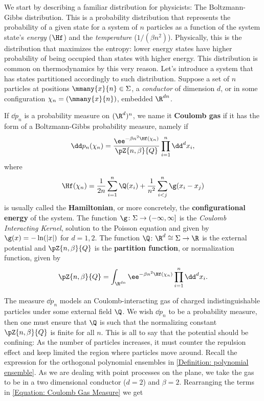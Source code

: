 We start by describing a familiar distribution for physicists: The Boltzmann-Gibbs distribution. This is a probability distribution that represents the probability of a given state for a system of $n$ particles as a function of the system state's \textit{energy} ($\Hf$) and the \textit{temperature} ($1/(\beta n^2)$). Physically, this is the distribution that maximizes the entropy: lower energy states have higher probability of being occupied than states with higher energy.  This distribution is common on thermodynamics by this very reason. Let's introduce a system that has states partitioned accordingly to such distribution. Suppose a set of $n$ particles at positions $\mmany{x}{n} \in \Sigma$, a \textit{conductor} of dimension $d$, or in some configuration $\chi_n = (\mmany{x}{n})$, embedded $\R^{dn}$.
\begin{definicao}
	If $\dd p_n$ is a probability measure on $(\R^d)^n$, we name it \textbf{Coulomb gas} if it has the form of a Boltzmann-Gibbs probability measure, namely if
	\begin{equation}
		\dd p_n(\chi_n) = \frac{\ee^{-\beta n^2 \Hf(\chi_n)}}{\pZ{n, \beta}{Q}} \prod_{i=1}^{n} \dd^d x_i,
		\label{Equation: Coulomb Gas Measure}
	\end{equation}
	where 
	\begin{equation}
		\Hf(\chi_n) = \frac{1}{2n} \sum_{i = 1}^{n} \Q(x_i) + \frac{1}{n^2} \sum_{i < j}^{n} \g(x_i - x_j)	
	\end{equation}
	is usually called the \textbf{Hamiltonian}, or more concretely, the \textbf{configurational energy} of the system. The function $\g \colon \Sigma \rightarrow (-\infty, \infty]$ is the \textit{Coulomb Interacting Kernel}, solution to the Poisson equation and given by 
	$
	\g(x) = - \ln(|x|)
	$ for $d = 1, 2$.
	The function $\Q \colon \R^d \cong \Sigma \rightarrow \R$ is the external potential and $\pZ{n,\beta}{Q}$ is the \textbf{partition function}, or normalization function, given by
	\begin{equation}
		\pZ{n,\beta}{Q} = \int_{\R^{dn}}  \ee^{-\beta n^2 \Hf(\chi_n)}  \prod_{i=1}^{n} \dd^d x_i.
	\end{equation}
\end{definicao}
The measure $\dd p_n$ models an Coulomb-interacting gas of charged indistinguishable particles under some external field $\Q$. We wish $\dd p_n$ to be a probability measure,  then one must ensure that $\Q$ is such that the normalizing constant $\pZ{n,\beta}{Q}$ is finite for all $n$. This is all to say that the potential should be confining: As the number of particles increases, it must counter the repulsion effect and keep limited the region where particles move around. Recall the expression for the orthogonal polynomial ensembles in \autoref{Definition: polynomial ensemble}. As we are dealing with point processes on the plane, we take the gas to be in a two dimensional conductor ($d = 2$) and $\beta = 2$. Rearranging the terms in \eqref{Equation: Coulomb Gas Measure} we get
